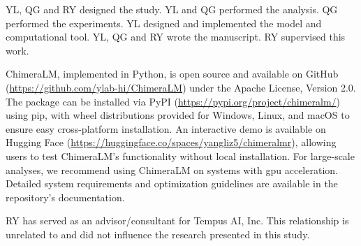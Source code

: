 \documentclass[pdflatex,sn-nature]{sn-jnl}%
\theoremstyle{thmstyleone}%
\theoremstyle{thmstyletwo}%
\theoremstyle{thmstylethree}%
\begin{document}

YL, QG and RY designed the study.
YL and QG performed the analysis.
QG performed the experiments.
YL designed and implemented the model and computational tool.
YL, QG and RY wrote the manuscript.
RY supervised this work.



ChimeraLM, implemented in Python, is open source and available on GitHub (\url{https://github.com/ylab-hi/ChimeraLM}) under the Apache License, Version 2.0.
The package can be installed via PyPI (\url{https://pypi.org/project/chimeralm/}) using pip, with wheel distributions provided for Windows, Linux, and macOS to ensure easy cross-platform installation.
An interactive demo is available on Hugging Face (\url{https://huggingface.co/spaces/yangliz5/chimeralmr}), allowing users to test ChimeraLM's functionality without local installation.
For large-scale analyses, we recommend using ChimeraLM on systems with \gls{gpu} acceleration. Detailed system requirements and optimization guidelines are available in the repository's documentation.


RY has served as an advisor/consultant for Tempus AI, Inc. This relationship is unrelated to and did not influence the research presented in this study.


%
\end{document}
